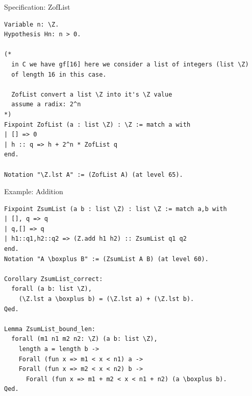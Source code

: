 \documentclass[8pt]{beamer}
\begin{document}
\begin{frame}[fragile]{Specification: ZofList}
  \begin{center}
\begin{lstlisting}[language=Coq, caption=ZofList, label=cod:languageC81]
Variable n: \Z.
Hypothesis Hn: n > 0.

(*
  in C we have gf[16] here we consider a list of integers (list \Z)
  of length 16 in this case.

  ZofList convert a list \Z into it's \Z value
  assume a radix: 2^n
*)
Fixpoint ZofList (a : list \Z) : \Z := match a with
| [] => 0
| h :: q => h + 2^n * ZofList q
end.

Notation "\Z.lst A" := (ZofList A) (at level 65).
\end{lstlisting}






  \end{center}
\end{frame}


%
%

\begin{frame}[fragile]{Example: Addition}
  \begin{center}
\begin{lstlisting}[language=Coq, caption=Addition, label=cod:languageC91]
Fixpoint ZsumList (a b : list \Z) : list \Z := match a,b with
| [], q => q
| q,[] => q
| h1::q1,h2::q2 => (Z.add h1 h2) :: ZsumList q1 q2
end.
Notation "A \boxplus B" := (ZsumList A B) (at level 60).

Corollary ZsumList_correct:
  forall (a b: list \Z),
    (\Z.lst a \boxplus b) = (\Z.lst a) + (\Z.lst b).
Qed.

Lemma ZsumList_bound_len:
  forall (m1 n1 m2 n2: \Z) (a b: list \Z),
    length a = length b ->
    Forall (fun x => m1 < x < n1) a ->
    Forall (fun x => m2 < x < n2) b ->
      Forall (fun x => m1 + m2 < x < n1 + n2) (a \boxplus b).
Qed.
\end{lstlisting}

  \end{center}
\end{frame}
\end{document}

